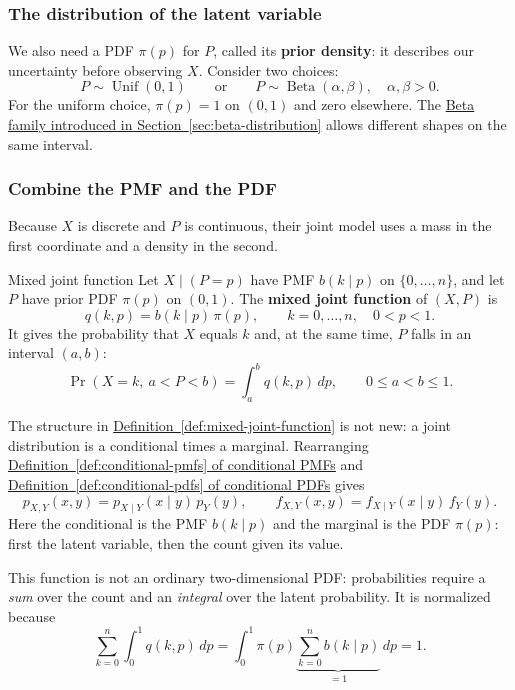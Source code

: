 \documentclass[a4paper,12pt,oneside]{report}
\begin{document}
\subsubsection{The distribution of the latent variable}
We also need a PDF $\pi(p)$ for $P$, called its \textbf{prior
density}: it describes our uncertainty before observing $X$.
Consider two choices:
\[
  P\sim\operatorname{Unif}(0,1)
  \qquad\text{or}\qquad
  P\sim\operatorname{Beta}(\alpha,\beta),\quad\alpha,\beta>0.
\]
For the uniform choice, $\pi(p)=1$ on $(0,1)$ and zero elsewhere.
The \hyperref[sec:beta-distribution]{Beta family introduced in Section~\ref{sec:beta-distribution}}
allows different shapes on the same interval.

\subsubsection{Combine the PMF and the PDF}
Because $X$ is discrete and $P$ is continuous, their joint model
uses a mass in the first coordinate and a density in the second.

\begin{frameddefn}{Mixed joint function}
\label{def:mixed-joint-function}
Let $X\mid(P=p)$ have PMF $b(k\mid p)$ on $\{0,\ldots,n\}$, and let
$P$ have prior PDF $\pi(p)$ on $(0,1)$.
The \textbf{mixed joint function} of $(X,P)$ is
\[
  q(k,p)=b(k\mid p)\,\pi(p),
  \qquad k=0,\ldots,n,\quad 0<p<1.
\]
It gives the probability that $X$ equals $k$ and, at the same time,
$P$ falls in an interval $(a,b)$:
\[
  \Pr(X=k,\ a<P<b)=\int_a^b q(k,p)\,dp,
  \qquad 0\leq a<b\leq1.
\]
\end{frameddefn}

\begin{notebox}
The structure in
\hyperref[def:mixed-joint-function]{Definition~\ref{def:mixed-joint-function}}
is not new: a joint distribution is a conditional
times a marginal. Rearranging
\hyperref[def:conditional-pmfs]{Definition~\ref{def:conditional-pmfs}
of conditional PMFs} and
\hyperref[def:conditional-pdfs]{Definition~\ref{def:conditional-pdfs}
of conditional PDFs} gives
\[
  p_{X,Y}(x,y)=p_{X\mid Y}(x\mid y)\,p_Y(y),
  \qquad
  f_{X,Y}(x,y)=f_{X\mid Y}(x\mid y)\,f_Y(y).
\]
Here the conditional is the PMF $b(k\mid p)$ and the marginal is
the PDF $\pi(p)$: first the latent variable, then the count given
its value.
\end{notebox}

This function is not an ordinary two-dimensional PDF: probabilities
require a \emph{sum} over the count and an \emph{integral} over
the latent probability.
It is normalized because
\[
  \sum_{k=0}^n\int_0^1 q(k,p)\,dp
    =\int_0^1\pi(p)
       \underbrace{\sum_{k=0}^n b(k\mid p)}_{=1}\,dp=1.
\]
\end{document}
